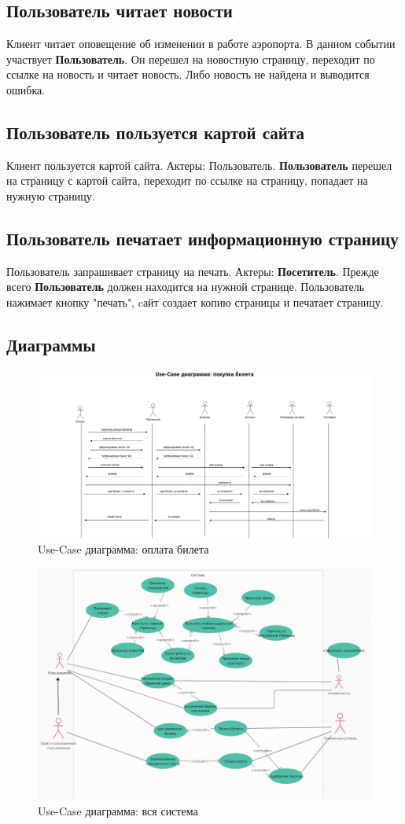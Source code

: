 \subsection{Пользователь читает новости}
Клиент читает оповещение об изменении в работе аэропорта.
В данном событии участвует \textbf{Пользователь}.
Он перешел на новостную страницу, переходит по ссылке на
новость и читает новость. Либо новость не найдена и
выводится ошибка.

\subsection{Пользователь пользуется картой сайта}
Клиент пользуется картой сайта. Актеры: Пользователь.
\textbf{Пользователь} перешел на страницу с картой сайта,
переходит по ссылке на страницу, попадает на нужную страницу.

\subsection{Пользователь печатает информационную страницу}
Пользователь запрашивает страницу на печать. Актеры:
\textbf{Посетитель}. Прежде всего \textbf{Пользователь}
должен находится на нужной странице. Пользователь нажимает
кнопку "печать", cайт создает копию страницы и печатает
страницу.

\subsection{Диаграммы}

\begin{figure}
      \includegraphics[width=16cm]{4-actions/use-case-payment.drawio.png}
      \centering
      \caption{Use-Case диаграмма: оплата билета}
\end{figure}

\begin{figure}
      \includegraphics[width=16cm]{4-actions/use-case.jpg}
      \centering
      \caption{Use-Case диаграмма: вся система}
\end{figure}
